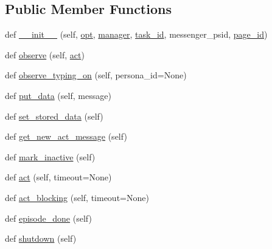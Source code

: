 \subsection*{Public Member Functions}
\begin{DoxyCompactItemize}
\item 
def \hyperlink{classparlai_1_1chat__service_1_1services_1_1messenger_1_1agents_1_1MessengerAgent_ae6235d9673cc211634aa461e0cc74de9}{\+\_\+\+\_\+init\+\_\+\+\_\+} (self, \hyperlink{classparlai_1_1core_1_1agents_1_1Agent_ab3b45d2754244608c75d4068b90cd051}{opt}, \hyperlink{classparlai_1_1chat__service_1_1services_1_1messenger_1_1agents_1_1MessengerAgent_a0763a8b25f945ac0ca7195d61f7bd1ec}{manager}, \hyperlink{classparlai_1_1chat__service_1_1services_1_1messenger_1_1agents_1_1MessengerAgent_a1be389d7ba217ad749d324d31fc1c4ba}{task\+\_\+id}, messenger\+\_\+psid, \hyperlink{classparlai_1_1chat__service_1_1services_1_1messenger_1_1agents_1_1MessengerAgent_aefc5070a7daf467a856cecb4be055d84}{page\+\_\+id})
\item 
def \hyperlink{classparlai_1_1chat__service_1_1services_1_1messenger_1_1agents_1_1MessengerAgent_aed8303ffef9e83bb5071ce7ab4f77bc6}{observe} (self, \hyperlink{classparlai_1_1chat__service_1_1services_1_1messenger_1_1agents_1_1MessengerAgent_a50484a75fb326cade0cb5c2b8a0614ac}{act})
\item 
def \hyperlink{classparlai_1_1chat__service_1_1services_1_1messenger_1_1agents_1_1MessengerAgent_af108212b0aa675814aa439247396abc4}{observe\+\_\+typing\+\_\+on} (self, persona\+\_\+id=None)
\item 
def \hyperlink{classparlai_1_1chat__service_1_1services_1_1messenger_1_1agents_1_1MessengerAgent_a4a050f12b4223f41e1d499c3cb334ca7}{put\+\_\+data} (self, message)
\item 
def \hyperlink{classparlai_1_1chat__service_1_1services_1_1messenger_1_1agents_1_1MessengerAgent_a29c5373354ffdbef8fbd140861c300e8}{set\+\_\+stored\+\_\+data} (self)
\item 
def \hyperlink{classparlai_1_1chat__service_1_1services_1_1messenger_1_1agents_1_1MessengerAgent_accb5cc3e4ed2214d6433a0c64cab54cb}{get\+\_\+new\+\_\+act\+\_\+message} (self)
\item 
def \hyperlink{classparlai_1_1chat__service_1_1services_1_1messenger_1_1agents_1_1MessengerAgent_a54599a1e6c1f72fb4d18775752de3884}{mark\+\_\+inactive} (self)
\item 
def \hyperlink{classparlai_1_1chat__service_1_1services_1_1messenger_1_1agents_1_1MessengerAgent_a50484a75fb326cade0cb5c2b8a0614ac}{act} (self, timeout=None)
\item 
def \hyperlink{classparlai_1_1chat__service_1_1services_1_1messenger_1_1agents_1_1MessengerAgent_aac5be8bc083485bb95a3579d73eeacfc}{act\+\_\+blocking} (self, timeout=None)
\item 
def \hyperlink{classparlai_1_1chat__service_1_1services_1_1messenger_1_1agents_1_1MessengerAgent_ac5efb0b957f90ef8546d934a640da1e2}{episode\+\_\+done} (self)
\item 
def \hyperlink{classparlai_1_1chat__service_1_1services_1_1messenger_1_1agents_1_1MessengerAgent_a84f14647eaa8536cad36813d02206949}{shutdown} (self)
\end{DoxyCompactItemize}
